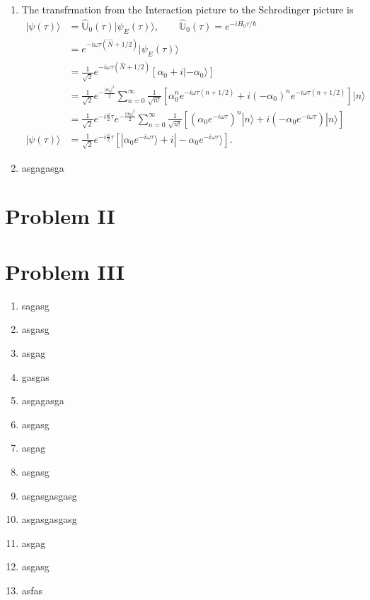 \documentclass[letterpaper,11pt,twoside]{article}
\newcommand{\ket}[1]{|#1\rangle}
\begin{document}
\begin{enumerate}[itemsep=0pt,topsep=0pt,label=\alph*)]
  \item The transfrmation from the Interaction picture to the Schrodinger picture is 
  \begin{align*}
    \ket{\psi(\tau)}&=\hat{\mathbb{U}}_0(\tau)\ket{\psi_E(\tau)},\qquad\hat{\mathbb{U}}_0(\tau)=e^{-iH_0\tau/\hbar}\\
    &=e^{-i\omega\tau(\hat{N}+1/2)}\ket{\psi_E(\tau)}\\
    &=\frac{1}{\sqrt{2}}e^{-i\omega\tau(\hat{N}+1/2)}[\alpha_0+i\ket{-\alpha_0}]\\
    &=\frac{1}{\sqrt{2}}e^{-\frac{|\alpha_0|^2}{2}}\sum_{n=0}^\infty\frac{1}{\sqrt{n!}}\left[\alpha_0^ne^{-i\omega\tau(n+1/2)}+i(-\alpha_0)^ne^{-i\omega\tau(n+1/2)}\right]\ket{n}\\
    &=\frac{1}{\sqrt{2}}e^{-i\frac{\omega}{2}\tau}e^{-\frac{|\alpha_0|^2}{2}}\sum_{n=0}^\infty\frac{1}{\sqrt{n!}}\left[\left(\alpha_0e^{-i\omega\tau}\right)^n\ket{n}+i\left(-\alpha_0e^{-i\omega\tau}\right)\ket{n}\right]\\
    \ket{\psi(\tau)}&=\frac{1}{\sqrt{2}}e^{-i\frac{\omega}{2}\tau}\left[\ket{\alpha_0e^{-i\omega\tau}}+i\ket{-\alpha_0e^{-i\omega\tau}}\right].
  \end{align*}
  \item asgagasga
\end{enumerate}
\section*{Problem II}

\section*{Problem III}
\begin{enumerate}[itemsep=0pt,topsep=0pt,label=\alph*)]
  \item sagasg
  \item asgasg
  \item asgag
  \item gasgas
  \item asgagasga
  \item asgasg
  \item asgag
  \item asgasg
  \item asgasgasgasg
  \item asgasgasgasg
  \item asgag
  \item asgasg
  \item asfas
\end{enumerate}
\end{document}
